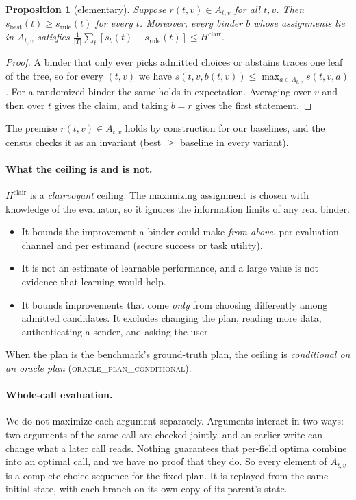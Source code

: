 \documentclass{article}
\newtheorem{proposition}{Proposition}
\begin{document}
\begin{proposition}[elementary]
\label{prop:bound}
Suppose $r(t,v)\in A_{t,v}$ for all $t,v$. Then
$s_{\mathrm{best}}(t)\ge s_{\mathrm{rule}}(t)$ for every $t$. Moreover,
every binder $b$ whose assignments lie in $A_{t,v}$ satisfies
$\frac{1}{|T|}\sum_t[s_b(t)-s_{\mathrm{rule}}(t)]\le H^{\mathrm{clair}}$.
\end{proposition}
\begin{proof}
A binder that only ever picks admitted choices or abstains traces one leaf
of the tree, so for every $(t,v)$ we have
$s(t,v,b(t,v))\le\max_{a\in A_{t,v}}s(t,v,a)$. For a randomized binder the
same holds in expectation. Averaging over $v$ and then over $t$ gives the
claim, and taking $b=r$ gives the first statement.
\end{proof}
The premise $r(t,v)\in A_{t,v}$ holds by construction for our baselines,
and the census checks it as an invariant (best $\ge$ baseline in every
variant).

\paragraph{What the ceiling is and is not.}
$H^{\mathrm{clair}}$ is a \emph{clairvoyant} ceiling. The maximizing
assignment is chosen with knowledge of the evaluator, so it ignores the
information limits of any real binder.
\begin{itemize}
\item It bounds the improvement a binder could make \emph{from above}, per
evaluation channel and per estimand (secure success or task utility).
\item It is not an estimate of learnable performance, and a large value is
not evidence that learning would help.
\item It bounds improvements that come \emph{only} from choosing differently
among admitted candidates. It excludes changing the plan, reading more data,
authenticating a sender, and asking the user.
\end{itemize}
When the plan is the benchmark's ground-truth plan, the ceiling is
\emph{conditional on an oracle plan} (\textsc{oracle\_plan\_conditional}).

\paragraph{Whole-call evaluation.}
We do not maximize each argument separately. Arguments interact in two ways:
two arguments of the same call are checked jointly, and an earlier write can
change what a later call reads. Nothing guarantees that per-field optima
combine into an optimal call, and we have no proof that they do. So every
element of $A_{t,v}$ is a complete choice sequence for the fixed plan. It is
replayed from the same initial state, with each branch on its own copy of
its parent's state.
\end{document}
